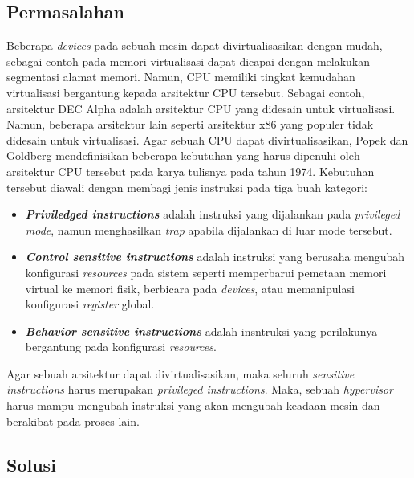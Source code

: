 \subsection{Permasalahan}

Beberapa \textit{devices} pada sebuah mesin dapat divirtualisasikan dengan mudah, sebagai contoh pada memori
virtualisasi dapat dicapai dengan melakukan segmentasi alamat memori. Namun, CPU memiliki tingkat kemudahan virtualisasi
bergantung kepada arsitektur CPU tersebut. Sebagai contoh, arsitektur DEC Alpha adalah arsitektur CPU yang didesain
untuk virtualisasi. Namun, beberapa arsitektur lain seperti arsitektur x86 yang populer tidak didesain untuk
virtualisasi. Agar sebuah CPU dapat divirtualisasikan, Popek dan Goldberg mendefinisikan beberapa kebutuhan yang harus
dipenuhi oleh arsitektur CPU tersebut pada karya tulisnya pada tahun 1974. Kebutuhan tersebut diawali dengan membagi
jenis instruksi pada tiga buah kategori:

\begin{itemize}

    \item \textit{\textbf{Priviledged instructions}} adalah instruksi yang dijalankan pada \textit{privileged mode},
        namun menghasilkan \textit{trap} apabila dijalankan di luar mode tersebut.

    \item \textit{\textbf{Control sensitive instructions}} adalah instruksi yang berusaha mengubah konfigurasi
        \textit{resources} pada sistem seperti memperbarui pemetaan memori virtual ke memori fisik, berbicara pada
        \textit{devices}, atau memanipulasi konfigurasi \textit{register} global.

    \item \textit{\textbf{Behavior sensitive instructions}} adalah insntruksi yang perilakunya bergantung pada
        konfigurasi \textit{resources}.

\end{itemize}

Agar sebuah arsitektur dapat divirtualisasikan, maka seluruh \textit{sensitive instructions} harus merupakan
\textit{privileged instructions}. Maka, sebuah \textit{hypervisor} harus mampu mengubah instruksi yang akan mengubah
keadaan mesin dan berakibat pada proses lain.

\subsection{Solusi}

